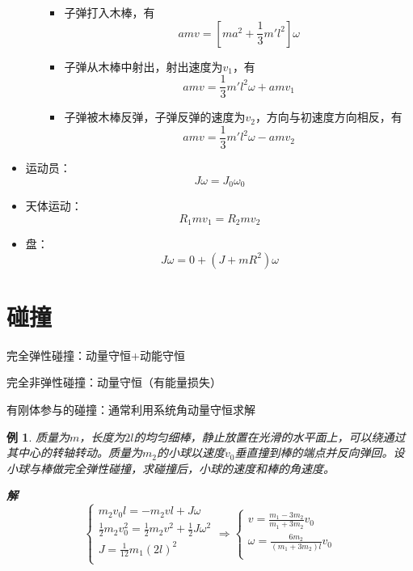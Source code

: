 \documentclass[12pt, a4paper, twoside]{ctexbook}
\newtheorem{example}[theorem]{例}
\begin{document}
\begin{itemize}
\begin{itemize}
\begin{figure}[H]
        \end{figure}
        \begin{itemize}
            \item 子弹打入木棒，有
            $$
            amv=\left[ma^2+\frac{1}{3}m'l^2\right]\omega
            $$
            \item 子弹从木棒中射出，射出速度为$v_1$，有
            $$
            amv=\frac{1}{3}m'l^2\omega+amv_1
            $$
            \item 子弹被木棒反弹，子弹反弹的速度为$v_2$，方向与初速度方向相反，有
            $$
            amv=\frac{1}{3}m'l^2\omega-amv_2
            $$
        \end{itemize} 
    \end{itemize}
    \item {\sonti 运动员}：
    $$
    J\omega=J_0\omega_0
    $$
    \item {\sonti 天体运动}：
    $$
    R_1mv_1=R_2mv_2
    $$
    \item {\sonti 盘}：
    $$
    J\omega=0+\left(J+mR^2\right)\omega
    $$
\end{itemize}
\section{碰撞}
{\sonti 完全弹性碰撞}：动量守恒+动能守恒

{\sonti 完全非弹性碰撞}：动量守恒（有能量损失）

{\sonti 有刚体参与的碰撞}：通常利用系统角动量守恒求解
\begin{example}
    质量为$m$，长度为$2l$的均匀细棒，静止放置在光滑的水平面上，可以绕通过其中心的转轴转动。质量为$m_2$的小球以速度$v_0$垂直撞到棒的端点并反向弹回。设小球与棒做完全弹性碰撞，求碰撞后，小球的速度和棒的角速度。
    
    \noindent\textbf{解}
    $$
    \left\{ \begin{array}{l}
	m_2v_0l=-m_2vl+J\omega\\
	\frac{1}{2}m_2v_{0}^{2}=\frac{1}{2}m_2v^2+\frac{1}{2}J\omega ^2\\
	J=\frac{1}{12}m_1\left( 2l \right) ^2\\
    \end{array}\Rightarrow \left\{ \begin{array}{l}
	v=\frac{m_1-3m_2}{m_1+3m_2}v_0\\
	\omega =\frac{6m_2}{\left( m_1+3m_2 \right) l}v_0\\
    \end{array} \right. \right. 
    $$
\end{example}
\end{document}
